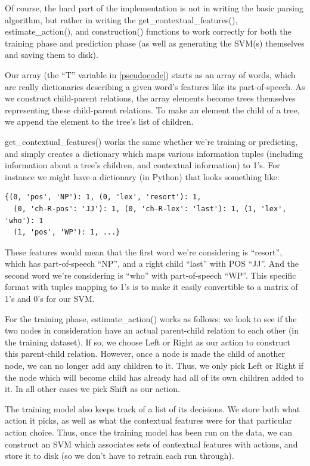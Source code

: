 \documentclass[12pt]{amsart}
\begin{document}
Of course, the hard part of the implementation is not in writing the basic 
parsing algorithm, but
rather in writing the get\_contextual\_features(), estimate\_action(),
and construction() functions
to work correctly for both the training phase and prediction phase (as well
as generating the SVM(s) themselves and saving them to disk).

Our array (the ``T'' variable in \ref{pseudocode}) 
starts as an array of words, which are really
dictionaries describing a given word's features like its part-of-speech. As we construct
child-parent relations, the array elements become trees themselves representing
these child-parent relations. To make an element the child of a tree, we append 
the element to the tree's list of children.

get\_contextual\_features() works the same whether we're training or predicting,
and simply creates a dictionary which maps various information tuples 
(including information about a tree's children, and contextual information) to
1's. For instance we might have a dictionary (in Python) that looks something 
like:
\begin{verbatim}
{(0, 'pos', 'NP'): 1, (0, 'lex', 'resort'): 1,
  (0, 'ch-R-pos': 'JJ'): 1, (0, 'ch-R-lex': 'last'): 1, (1, 'lex', 'who'): 1
  (1, 'pos', 'WP'): 1, ...}
\end{verbatim}
These features would mean that the first word we're considering is ``resort'',
which has part-of-speech ``NP'', and a right child ``last'' with POS ``JJ''. And the
second word we're considering is ``who'' with part-of-speech ``WP''. This specific format
with tuples mapping to 1's is to make it easily convertible to a matrix of 1's and 
0's for our SVM.

For the training phase, estimate\_action() works as follows: we look to see if
the two nodes in consideration have an actual parent-child relation to each 
other (in the training dataset). If so, we choose Left or Right as our action 
to construct this parent-child relation. However, once a node is made the 
child of another node, we can no longer add any children to it. Thus, we only
pick Left or Right if the node which will become child has already had all of
its own children added to it. In all other cases we pick Shift as our action.

The training model also keeps track of a list of its decisions. We store both
what action it picks, as well as what the contextual features were for that
particular action choice. Thus, once the training model has been run on the
data, we can construct an SVM which associates sets of contextual features 
with actions, and store it to disk (so we don't have to retrain each run
through).
\end{document}
